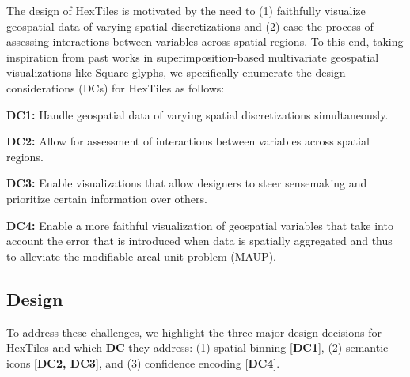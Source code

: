 The design of HexTiles is motivated by the need to (1) faithfully visualize geospatial data of varying spatial discretizations and (2) ease the process of assessing interactions between variables across spatial regions.
%
To this end, taking inspiration from past works in superimposition-based multivariate geospatial visualizations like Square-glyphs, we specifically enumerate the design considerations (DCs) for HexTiles as follows:
\begin{tightItemize}
    \item \textbf{DC1:} Handle geospatial data of varying spatial discretizations simultaneously.
    \item \textbf{DC2:} Allow for assessment of interactions between variables across spatial regions.
    \item \textbf{DC3:} Enable visualizations that allow designers to steer sensemaking and prioritize certain information over others.
    \item \textbf{DC4:} Enable a more faithful visualization of geospatial variables that take into account the error that is introduced when data is spatially aggregated and thus to alleviate the modifiable areal unit problem (MAUP).
\end{tightItemize}
\subsection{Design}
%
To address these challenges, we highlight the three major design decisions for HexTiles and which \textbf{DC} they address: (1) spatial binning [\textbf{DC1}], (2) semantic icons [\textbf{DC2, DC3}], and (3) confidence encoding [\textbf{DC4}].



